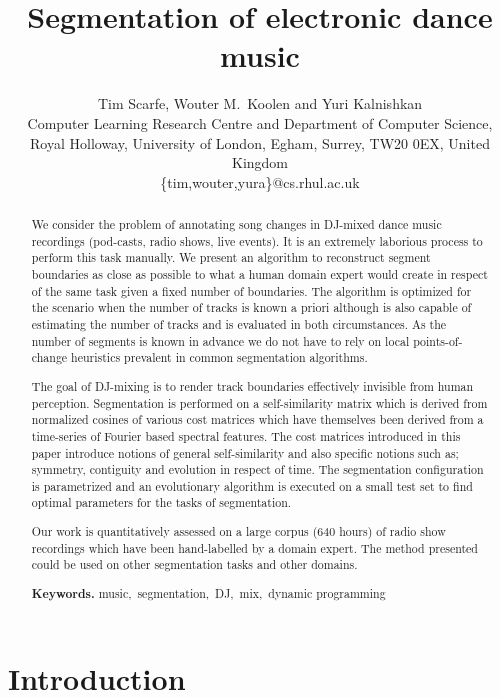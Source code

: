 \documentclass[twocolumn]{article}
\author{Tim Scarfe, Wouter M.~Koolen and Yuri Kalnishkan \\ 
	Computer Learning Research
	Centre and Department of Computer Science, \\ 
	Royal Holloway,  University of London, Egham, Surrey, TW20 0EX, United Kingdom\\
	\{tim,wouter,yura\}@cs.rhul.ac.uk
}
\title{Segmentation of electronic dance music}
\begin{document}
	
	\maketitle
	
	\begin{abstract}
		
We consider the problem of annotating song changes in DJ-mixed dance music recordings (pod-casts, radio shows, live events). It is an extremely laborious process to perform this task manually. We present an algorithm to reconstruct segment boundaries as close as possible to what a human domain expert would create in respect of the same task given a fixed number of boundaries. The algorithm is optimized for the scenario when the number of tracks is known a priori although is also capable of estimating the number of tracks and is evaluated in both circumstances. As the number of segments is known in advance we do not have to rely on local points-of-change heuristics prevalent in common segmentation algorithms. 

The goal of DJ-mixing is to render track boundaries effectively invisible from human perception. Segmentation is performed on a self-similarity matrix which is derived from normalized cosines of various cost matrices which have themselves been derived from a time-series of Fourier based spectral features. The cost matrices introduced in this paper introduce notions of general self-similarity and also specific notions such as; symmetry, contiguity and evolution in respect of time. The segmentation configuration is parametrized and an evolutionary algorithm is executed on a small test set to find optimal parameters for the tasks of segmentation. 

Our work is quantitatively assessed on a large corpus ($640$ hours) of radio show recordings which have been hand-labelled by a domain expert. The method presented could be used on other segmentation tasks and other domains. 
		\smallskip
		
		\noindent \textbf{Keywords.} \noindent music,~segmentation,~DJ,~mix,~dynamic programming
		
	\end{abstract}
	
	
	\vspace{1em}
	
	\section{Introduction}
	
\end{document}
